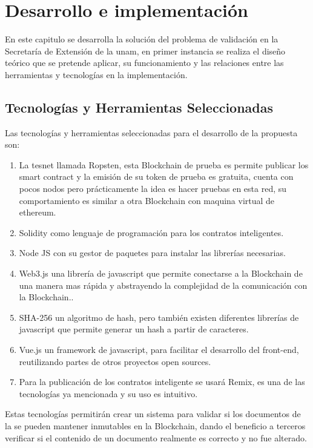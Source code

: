 \chapter{Desarrollo e implementación}
En este capitulo se desarrolla la solución del problema de validación en la Secretaría de Extensión de la \gls{unam},
en primer instancia se realiza el diseño teórico que se pretende aplicar, su funcionamiento y las relaciones entre las
herramientas y tecnologías en la implementación. 

\section{Tecnologías y Herramientas Seleccionadas}
Las tecnologías y herramientas seleccionadas para el desarrollo de la propuesta son:
\begin{enumerate}
    \item La tesnet llamada Ropsten, esta  Blockchain de prueba es permite publicar los smart contract
    y la emisión de su token de prueba es gratuita, cuenta con pocos nodos pero prácticamente
    la idea es hacer pruebas en esta red, su comportamiento es similar a otra  Blockchain con maquina virtual de ethereum.
    \item Solidity como lenguaje de programación para los contratos inteligentes\cite[]{bragagnolo_smartinspect_2018,dannen_introducing_2017}.
    \item Node JS con su gestor de paquetes para instalar las librerías necesarias.
    \item Web3.js una librería de javascript que permite conectarse a la  Blockchain de una manera mas rápida y abstrayendo la complejidad de la comunicación
    con la Blockchain.\cite[]{dannen_introducing_2017}.
    \item SHA-256 un algoritmo de hash, pero también existen diferentes  librerías de  javascript que permite generar un hash a partir de caracteres.
    \item Vue.js un framework de javascript, para facilitar el desarrollo del front-end, reutilizando partes de otros proyectos open sources.
    \item Para la publicación de los contratos inteligente se usará Remix, es una de las tecnologías ya mencionada y su uso 
    es intuitivo.

\end{enumerate}

Estas tecnologías permitirán crear un sistema para validar si los documentos de la  se pueden 
mantener inmutables en la Blockchain, dando el beneficio a terceros verificar si el contenido de un documento realmente es correcto y no fue alterado. 

